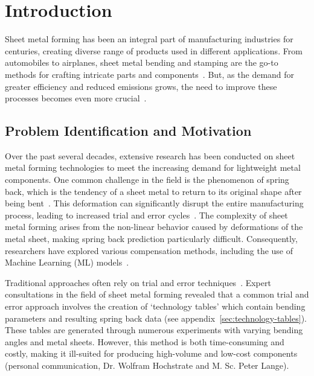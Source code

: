 \chapter{Introduction}\label{ch:introduction}

Sheet metal forming has been an integral part of manufacturing industries for centuries, creating
diverse range of products used in different applications.
From automobiles to airplanes, sheet metal bending and stamping are the go-to methods for
crafting intricate parts and components~\cite[p. 1]{cruz_applicationmachinelearning_2021}.
But, as the demand for greater efficiency and reduced emissions grows, the need to improve these
processes becomes even more crucial~\cite[p. 4]{zheng_reviewformingtechniques_2018}.


\section{Problem Identification and Motivation}\label{sec:problem-identification-and-motivation}
Over the past several decades, extensive research has been conducted on sheet metal forming technologies to meet the
increasing demand for lightweight metal components.
One common challenge in the field is the phenomenon of spring back, which is the tendency of a sheet metal to return
to its original shape after being bent~\cite[p. 1]{cruz_applicationmachinelearning_2021}.
This deformation can significantly disrupt the entire manufacturing process, leading to increased trial and error
cycles~\cite[p. 1]{cruz_applicationmachinelearning_2021}.
The complexity of sheet metal forming arises from the non-linear behavior caused by deformations of the metal sheet,
making spring back prediction particularly difficult.
Consequently, researchers have explored various compensation methods, including the use of Machine Learning (ML)
models~\cite[p.1]{liu_newmachinelearning_2012}.

Traditional approaches often rely on trial and error techniques~\cite[p. 1]{dib_singleensembleclassifiers_2020}.
Expert consultations in the field of sheet metal forming revealed that a common trial and error approach involves the
creation of `technology tables' which contain bending parameters and resulting spring back data
(see appendix~\ref{sec:technology-tables}).
These tables are generated through numerous experiments with varying bending angles and metal sheets.
However, this method is both time-consuming and costly, making it ill-suited for producing high-volume and low-cost
components (personal communication, Dr. Wolfram Hochstrate and M. Sc. Peter Lange).

